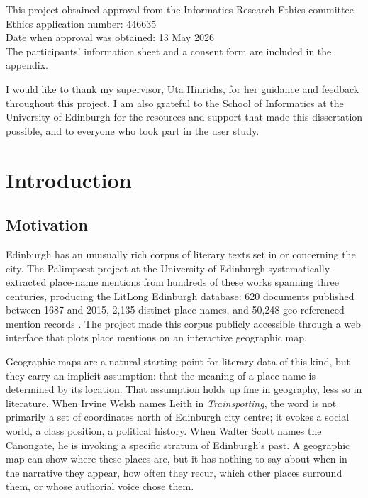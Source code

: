 \documentclass[logo,msc]{infthesis}
\begin{document}
\begin{preliminary}
\begin{ethics}
This project obtained approval from the Informatics Research Ethics committee.\\
Ethics application number: 446635\\
Date when approval was obtained: 13 May 2026\\
The participants' information sheet and a consent form are included in the appendix.\\
\standarddeclaration
\end{ethics}
 
\begin{acknowledgements}
I would like to thank my supervisor, Uta Hinrichs, for her guidance and feedback throughout this project. I am also grateful to the School of Informatics at the University of Edinburgh for the resources and support that made this dissertation possible, and to everyone who took part in the user study.
\end{acknowledgements}
 
\tableofcontents
\listoffigures
 
\end{preliminary}
 
 
\chapter{Introduction}
\label{chap:intro}

\section{Motivation}
 
Edinburgh has an unusually rich corpus of literary texts set in or concerning the city. The Palimpsest project at the University of Edinburgh systematically extracted place-name mentions from hundreds of these works spanning three centuries, producing the LitLong Edinburgh database: 620 documents published between 1687 and 2015, 2,135 distinct place names, and 50,248 geo-referenced mention records \cite{anderson2016}. The project made this corpus publicly accessible through a web interface that plots place mentions on an interactive geographic map.
 
Geographic maps are a natural starting point for literary data of this kind, but they carry an implicit assumption: that the meaning of a place name is determined by its location. That assumption holds up fine in geography, less so in literature. When Irvine Welsh names Leith in \textit{Trainspotting}, the word is not primarily a set of coordinates north of Edinburgh city centre; it evokes a social world, a class position, a political history. When Walter Scott names the Canongate, he is invoking a specific stratum of Edinburgh's past. A geographic map can show where these places are, but it has nothing to say about when in the narrative they appear, how often they recur, which other places surround them, or whose authorial voice chose them.
\end{document}
